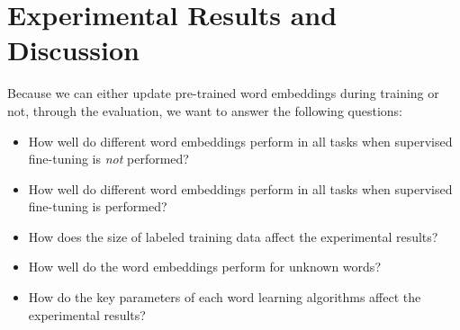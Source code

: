 \documentclass[11pt]{article}
\begin{document}



\section{Experimental Results and Discussion}



Because we can either update pre-trained word embeddings during training or not, through the evaluation, we want to answer the following questions:
\begin{itemize}
\item How well do different word embeddings perform in all tasks when supervised fine-tuning is \textit{not} performed?
\item How well do different word embeddings perform in all tasks when supervised fine-tuning is performed?
\item How does the size of labeled training data affect the experimental results?
\item How well do the word embeddings perform for unknown words? 
\item How do the key parameters of each word learning algorithms affect the experimental results?
\end{itemize}
\end{document}
